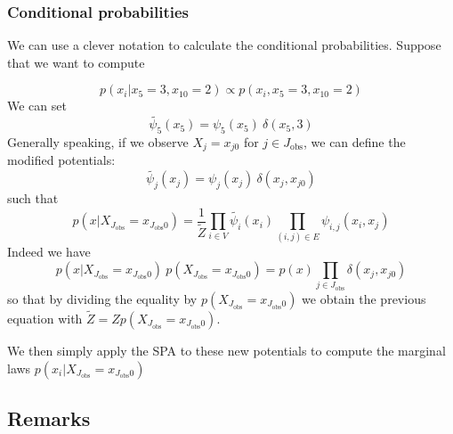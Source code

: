\documentclass[12pt,a4paper]{report}
\def\Jobs{J_{\text{obs}}}
\begin{document}
\subsubsection{Conditional probabilities}

We can use a clever notation to calculate the conditional probabilities. Suppose that we want to compute

\[
	p(x_i | x_5 = 3 , x_{10} = 2) \propto p(x_i , x_5 = 3 , x_{10} = 2)	
\]
We can set 
\[
	\tilde{\psi_5}(x_5) = \psi_5 (x_5) \ \delta(x_5,3) 
\]
Generally speaking, if we observe $X_j=x_{j0}$ for $j \in J_{\text{obs}}$, we can define the modified potentials:
\[
	\tilde{\psi_j}(x_j) = \psi_j (x_j) \ \delta(x_j,x_{j0}) 
\]
such that
\begin{equation}
p(x|X_{\Jobs}=x_{\Jobs0})= \frac{1}{\tilde{Z}} \prod_{i \in V} \tilde{\psi_i} (x_i) \prod_{(i,j) \in E} \psi_{i,j} (x_i,x_j)
\end{equation}
Indeed we have 
\begin{equation}
p(x|X_{\Jobs}=x_{\Jobs0}) \ p(X_{\Jobs}=x_{\Jobs0})=p(x) \prod_{j \in J_{\text{obs}}} \delta(x_j,x_{j0})
\end{equation}
so that by dividing the equality by $p(X_{\Jobs}=x_{\Jobs0})$ we obtain the previous equation with
$\tilde{Z}=Z p(X_{\Jobs}=x_{\Jobs0})$.

We then simply apply the SPA to these new potentials to compute the marginal laws $p(x_i|X_{\Jobs}=x_{\Jobs0})$

\subsection{Remarks}
\end{document}
